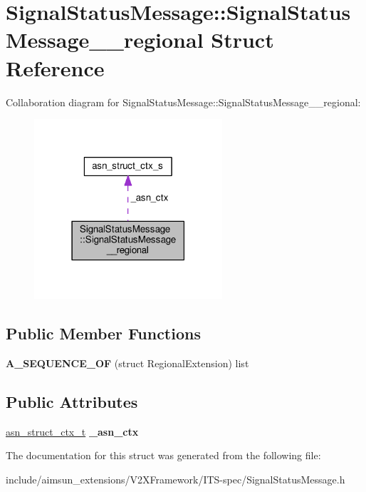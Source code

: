 \hypertarget{structSignalStatusMessage_1_1SignalStatusMessage____regional}{}\section{Signal\+Status\+Message\+:\+:Signal\+Status\+Message\+\_\+\+\_\+regional Struct Reference}
\label{structSignalStatusMessage_1_1SignalStatusMessage____regional}


Collaboration diagram for Signal\+Status\+Message\+:\+:Signal\+Status\+Message\+\_\+\+\_\+regional\+:\nopagebreak
\begin{figure}[H]
\begin{center}
\leavevmode
\includegraphics[width=198pt]{structSignalStatusMessage_1_1SignalStatusMessage____regional__coll__graph}
\end{center}
\end{figure}
\subsection*{Public Member Functions}
\begin{DoxyCompactItemize}
\item 
{\bfseries A\+\_\+\+S\+E\+Q\+U\+E\+N\+C\+E\+\_\+\+OF} (struct Regional\+Extension) list\hypertarget{structSignalStatusMessage_1_1SignalStatusMessage____regional_a349e9f5da40ab9013819b3066488300f}{}\label{structSignalStatusMessage_1_1SignalStatusMessage____regional_a349e9f5da40ab9013819b3066488300f}

\end{DoxyCompactItemize}
\subsection*{Public Attributes}
\begin{DoxyCompactItemize}
\item 
\hyperlink{structasn__struct__ctx__s}{asn\+\_\+struct\+\_\+ctx\+\_\+t} {\bfseries \+\_\+asn\+\_\+ctx}\hypertarget{structSignalStatusMessage_1_1SignalStatusMessage____regional_a5d141ba716f671dac667358d43f6bd1a}{}\label{structSignalStatusMessage_1_1SignalStatusMessage____regional_a5d141ba716f671dac667358d43f6bd1a}

\end{DoxyCompactItemize}


The documentation for this struct was generated from the following file\+:\begin{DoxyCompactItemize}
\item 
include/aimsun\+\_\+extensions/\+V2\+X\+Framework/\+I\+T\+S-\/spec/Signal\+Status\+Message.\+h\end{DoxyCompactItemize}
